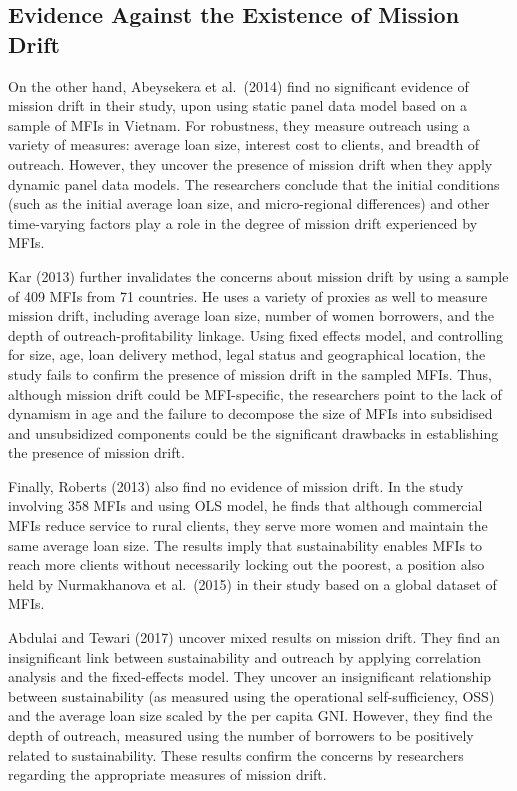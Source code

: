 \documentclass[a4paper, nobind]{templates/ociamthesis}
\begin{document}
\hypertarget{evidence-against-the-existence-of-mission-drift}{%
\subsection{Evidence Against the Existence of Mission Drift}\label{evidence-against-the-existence-of-mission-drift}}

\noindent On the other hand, Abeysekera et al.~(2014) find no significant evidence of mission drift in their study, upon using static panel data model based on a sample of MFIs in Vietnam. For robustness, they measure outreach using a variety of measures: average loan size, interest cost to clients, and breadth of outreach. However, they uncover the presence of mission drift when they apply dynamic panel data models. The researchers conclude that the initial conditions (such as the initial average loan size, and micro-regional differences) and other time-varying factors play a role in the degree of mission drift experienced by MFIs.

Kar (2013) further invalidates the concerns about mission drift by using a sample of 409 MFIs from 71 countries. He uses a variety of proxies as well to measure mission drift, including average loan size, number of women borrowers, and the depth of outreach-profitability linkage. Using fixed effects model, and controlling for size, age, loan delivery method, legal status and geographical location, the study fails to confirm the presence of mission drift in the sampled MFIs. Thus, although mission drift could be MFI-specific, the researchers point to the lack of dynamism in age and the failure to decompose the size of MFIs into subsidised and unsubsidized components could be the significant drawbacks in establishing the presence of mission drift.

Finally, Roberts (2013) also find no evidence of mission drift. In the study involving 358 MFIs and using OLS model, he finds that although commercial MFIs reduce service to rural clients, they serve more women and maintain the same average loan size. The results imply that sustainability enables MFIs to reach more clients without necessarily locking out the poorest, a position also held by Nurmakhanova et al.~(2015) in their study based on a global dataset of MFIs.

Abdulai and Tewari (2017) uncover mixed results on mission drift. They find an insignificant link between sustainability and outreach by applying correlation analysis and the fixed-effects model. They uncover an insignificant relationship between sustainability (as measured using the operational self-sufficiency, OSS) and the average loan size scaled by the per capita GNI. However, they find the depth of outreach, measured using the number of borrowers to be positively related to sustainability. These results confirm the concerns by researchers regarding the appropriate measures of mission drift.
\end{document}
